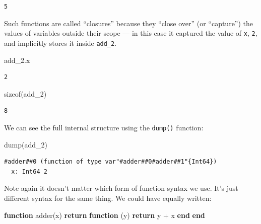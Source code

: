 \documentclass[
]{article}
\newenvironment{Shaded}{\begin{snugshade}}{\end{snugshade}}
\newcommand{\ControlFlowTok}[1]{\textcolor[rgb]{0.00,0.23,0.31}{\textbf{#1}}}
\newcommand{\FunctionTok}[1]{\textcolor[rgb]{0.28,0.35,0.67}{#1}}
\newcommand{\KeywordTok}[1]{\textcolor[rgb]{0.00,0.23,0.31}{\textbf{#1}}}
\newcommand{\NormalTok}[1]{\textcolor[rgb]{0.00,0.23,0.31}{#1}}
\newcommand{\OperatorTok}[1]{\textcolor[rgb]{0.37,0.37,0.37}{#1}}
\begin{document}
\begin{verbatim}
5
\end{verbatim}

Such functions are called ``closures'' because they ``close over'' (or
``capture'') the values of variables outside their scope --- in this
case it captured the value of \texttt{x}, \texttt{2}, and implicitly
stores it inside \texttt{add\_2}.

\begin{Shaded}
\begin{Highlighting}[]
\NormalTok{add\_2.x}
\end{Highlighting}
\end{Shaded}

\begin{verbatim}
2
\end{verbatim}

\begin{Shaded}
\begin{Highlighting}[]
\FunctionTok{sizeof}\NormalTok{(add\_2)}
\end{Highlighting}
\end{Shaded}

\begin{verbatim}
8
\end{verbatim}

We can see the full internal structure using the \texttt{dump()}
function:

\begin{Shaded}
\begin{Highlighting}[]
\FunctionTok{dump}\NormalTok{(add\_2)}
\end{Highlighting}
\end{Shaded}

\begin{verbatim}
#adder##0 (function of type var"#adder##0#adder##1"{Int64})
  x: Int64 2
\end{verbatim}

Note again it doesn't matter which form of function syntax we use. It's
just different syntax for the same thing. We could have equally written:

\begin{Shaded}
\begin{Highlighting}[]
\KeywordTok{function} \FunctionTok{adder}\NormalTok{(x)}
   \ControlFlowTok{return} \KeywordTok{function}\NormalTok{ (y)}
   \ControlFlowTok{return}\NormalTok{ y }\OperatorTok{+}\NormalTok{ x}
   \KeywordTok{end}
\KeywordTok{end}
\end{Highlighting}
\end{Shaded}
\end{document}
